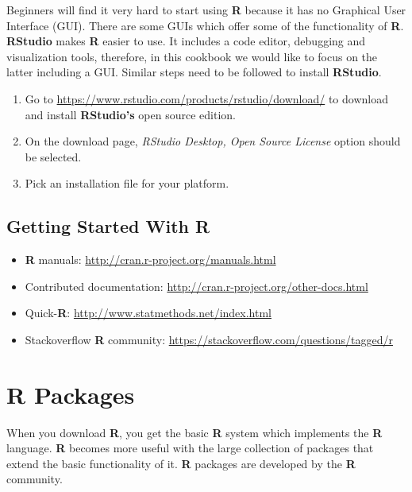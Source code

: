 \documentclass[10pt,b5paper,]{book}
\providecommand{\tightlist}{%
  \setlength{\itemsep}{0pt}\setlength{\parskip}{0pt}}
\theoremstyle{definition}
\theoremstyle{definition}
\theoremstyle{definition}
\theoremstyle{remark}
\begin{document}
Beginners will find it very hard to start using \textbf{R} because it
has no Graphical User Interface (GUI). There are some GUIs which offer
some of the functionality of \textbf{R}. \textbf{RStudio} makes
\textbf{R} easier to use. It includes a code editor, debugging and
visualization tools, therefore, in this cookbook we would like to focus
on the latter including a GUI. Similar steps need to be followed to
install \textbf{RStudio}.

\begin{enumerate}
\def\labelenumi{\arabic{enumi}.}
\tightlist
\item
  Go to \url{https://www.rstudio.com/products/rstudio/download/} to
  download and install \textbf{RStudio's} open source edition.
\item
  On the download page, \emph{RStudio Desktop, Open Source License}
  option should be selected.
\item
  Pick an installation file for your platform.
\end{enumerate}

\hypertarget{getting-started-with-r}{%
\subsection{Getting Started With R}\label{getting-started-with-r}}

\begin{itemize}
\tightlist
\item
  \textbf{R} manuals: \url{http://cran.r-project.org/manuals.html}
\item
  Contributed documentation:
  \url{http://cran.r-project.org/other-docs.html}
\item
  Quick-\textbf{R}: \url{http://www.statmethods.net/index.html}
\item
  Stackoverflow \textbf{R} community:
  \url{https://stackoverflow.com/questions/tagged/r}
\end{itemize}

\hypertarget{r-packages}{%
\section{R Packages}\label{r-packages}}

When you download \textbf{R}, you get the basic \textbf{R} system which
implements the \textbf{R} language. \textbf{R} becomes more useful with
the large collection of packages that extend the basic functionality of
it. \textbf{R} packages are developed by the \textbf{R} community.
\end{document}
